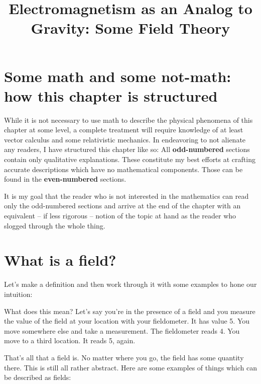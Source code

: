 \documentclass[11pt]{article}
\title{Electromagnetism as an Analog to Gravity: Some Field Theory}
\date{}                                           %
\begin{document}
\maketitle
\section*{Some math and some not-math: how this chapter is structured}
While it is not necessary to use math to describe the physical phenomena of this chapter at some level, a complete treatment will require knowledge of at least vector calculus and some relativistic mechanics.  In endeavoring to not alienate any readers, I have structured this chapter like so:  All \textbf{odd-numbered} sections contain only qualitative explanations.  These constitute my best efforts at crafting accurate descriptions which have no mathematical components.  Those can be found in the \textbf{even-numbered} sections.

It is my goal that the reader who is not interested in the mathematics can read only the odd-numbered sections and arrive at the end of the chapter with an equivalent -- if less rigorous -- notion of the topic at hand as the reader who slogged through the whole thing.

\section{What is a field?}
Let's make a definition and then work through it with some examples to hone our intuition:
\begin{center}
\end{center}

What does this mean?  Let's say you're in the presence of a field and you measure the value of the field at your location with your fieldometer.  It has value 5.  You move somewhere else and take a measurement.  The fieldometer reads 4.  You move to a third location.  It reads 5, again.

That's all that a field is.  No matter where you go, the field has some quantity there.  This is still all rather abstract.  Here are some examples of things which can be described as fields:
\end{document}

